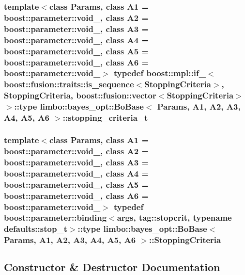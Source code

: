 \subsubsection[{stopping\+\_\+criteria\+\_\+t}]{\setlength{\rightskip}{0pt plus 5cm}template$<$class Params, class A1 = boost\+::parameter\+::void\+\_\+, class A2 = boost\+::parameter\+::void\+\_\+, class A3 = boost\+::parameter\+::void\+\_\+, class A4 = boost\+::parameter\+::void\+\_\+, class A5 = boost\+::parameter\+::void\+\_\+, class A6 = boost\+::parameter\+::void\+\_\+$>$ typedef boost\+::mpl\+::if\+\_\+$<$boost\+::fusion\+::traits\+::is\+\_\+sequence$<${\bf Stopping\+Criteria}$>$, {\bf Stopping\+Criteria}, boost\+::fusion\+::vector$<${\bf Stopping\+Criteria}$>$ $>$\+::type {\bf limbo\+::bayes\+\_\+opt\+::\+Bo\+Base}$<$ Params, A1, A2, A3, A4, A5, A6 $>$\+::{\bf stopping\+\_\+criteria\+\_\+t}}\label{classlimbo_1_1bayes__opt_1_1_bo_base_a8dfcab20696e6c85665b150e9881c010}
\hypertarget{classlimbo_1_1bayes__opt_1_1_bo_base_a06717d469296323cc277e3769b828e98}{}
\subsubsection[{Stopping\+Criteria}]{\setlength{\rightskip}{0pt plus 5cm}template$<$class Params, class A1 = boost\+::parameter\+::void\+\_\+, class A2 = boost\+::parameter\+::void\+\_\+, class A3 = boost\+::parameter\+::void\+\_\+, class A4 = boost\+::parameter\+::void\+\_\+, class A5 = boost\+::parameter\+::void\+\_\+, class A6 = boost\+::parameter\+::void\+\_\+$>$ typedef boost\+::parameter\+::binding$<${\bf args}, tag\+::stopcrit, typename {\bf defaults\+::stop\+\_\+t}$>$\+::type {\bf limbo\+::bayes\+\_\+opt\+::\+Bo\+Base}$<$ Params, A1, A2, A3, A4, A5, A6 $>$\+::{\bf Stopping\+Criteria}}\label{classlimbo_1_1bayes__opt_1_1_bo_base_a06717d469296323cc277e3769b828e98}


\subsection{Constructor \& Destructor Documentation}
\hypertarget{classlimbo_1_1bayes__opt_1_1_bo_base_ad361278c23693c4220eaa9a9de5d3333}{}
